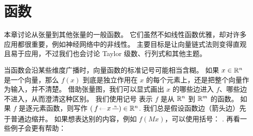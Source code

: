 

\chapter{函数}\label{chapter:functions}


本章讨论从张量到其他张量的一般函数。
它们虽然不如线性函数优雅，却对许多应用都很重要，例如神经网络中的非线性。
主要目标是让向量链式法则变得直观且易于应用，不过我们也会讨论 Taylor 级数、行列式和其他主题。

当函数会沿某些维度广播时，向量函数的标准记号可能相当含糊。
如果 $x\in\mathbb R^n$ 是一个向量，那么 $f(x)$ 到底是独立作用在 $x$ 的每个元素上，还是把整个向量作为输入，并不清楚。
借助张量图，我们可以显式画出 $x$ 的哪些边进入 $f$、哪些边不进入，从而澄清这种区别。
我们使用记号
表示 $f$ 是从 $\mathbb R^n$ 到 $\mathbb R^m$ 的函数。
如果 $f$ 是逐元素函数，则写作
$(\tikz[baseline=-.25em, inner sep=2pt]{
   \draw[->, densely dotted] (.3,0) node[right](x){$x$} -- (0,0) node(f)[left]{$f$};
   \draw (x) -- ++(.5,0) node[midway, above, font=\tiny] {$n$};
}) \in \R^n$.
我们总是假设函数边（箭头边）先于普通边缩并。
如果想表达别的内容，例如 $f(Mx)$，可以使用括号：
.
再看一些例子会更有帮助：
\vspace{-1.5em}
